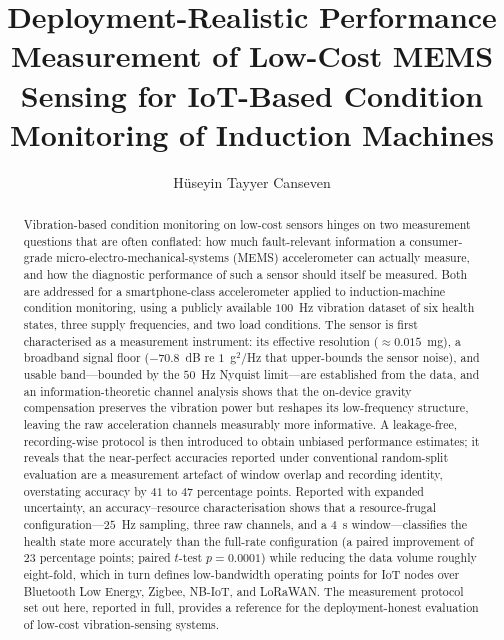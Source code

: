 \documentclass[anonymous]{iopjournal}
\begin{document}

\title{Deployment-Realistic Performance Measurement of Low-Cost MEMS Sensing
for IoT-Based Condition Monitoring of Induction Machines}

\author{H{\"u}seyin Tayyer Canseven}


\begin{abstract}
Vibration-based condition monitoring on low-cost sensors hinges on two
measurement questions that are often conflated: how much fault-relevant
information a consumer-grade micro-electro-mechanical-systems (MEMS)
accelerometer can actually measure, and how the diagnostic performance of such a
sensor should itself be measured. Both are addressed for a smartphone-class
accelerometer applied to induction-machine condition monitoring, using a
publicly available $100$~Hz vibration dataset of six health states, three supply
frequencies, and two load conditions. The sensor is first characterised as a
measurement instrument: its effective resolution ($\approx 0.015$~mg), a
broadband signal floor ($-70.8$~dB re $1$~g$^2$/Hz that upper-bounds the sensor
noise), and usable band---bounded by the $50$~Hz Nyquist limit---are established
from the data, and an information-theoretic channel
analysis shows that the on-device gravity compensation preserves the vibration
power but reshapes its low-frequency structure, leaving the raw acceleration
channels measurably more informative. A leakage-free, recording-wise protocol is then introduced to obtain
unbiased performance estimates; it reveals that the near-perfect accuracies
reported under conventional random-split evaluation are a measurement artefact of
window overlap and recording identity, overstating accuracy by $41$ to $47$
percentage points. Reported with expanded uncertainty, an accuracy--resource
characterisation shows that a resource-frugal configuration---$25$~Hz sampling,
three raw channels, and a $4$~s window---classifies the health state more
accurately than the full-rate configuration (a paired improvement of $23$
percentage points; paired $t$-test $p=0.0001$) while reducing the data volume
roughly eight-fold, which in turn defines low-bandwidth operating points for IoT nodes
over Bluetooth Low Energy, Zigbee, NB-IoT, and LoRaWAN. The measurement protocol set out
here, reported in full, provides a reference for the deployment-honest evaluation
of low-cost vibration-sensing systems.
\end{abstract}
\end{document}
